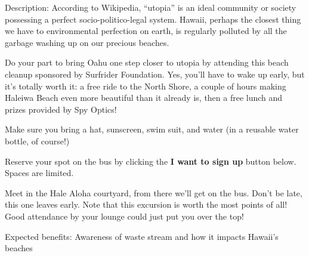 Description: According to Wikipedia, ``utopia'' is an ideal community or society possessing a perfect socio-politico-legal system. Hawaii, perhaps the closest thing we have to environmental perfection on earth, is regularly polluted by all the garbage washing up on our precious beaches.

Do your part to bring Oahu one step closer to utopia by attending this beach cleanup sponsored by Surfrider Foundation. Yes, you'll have to wake up early, but it's totally worth it: a free ride to the North Shore, a couple of hours making Haleiwa Beach even more beautiful than it already is, then a free lunch and prizes provided by Spy Optics!

Make sure you bring a hat, sunscreen, swim suit, and water (in a reusable water bottle, of course!)

Reserve your spot on the bus by clicking the \textbf{I want to sign up} button below. Spaces are limited.

Meet in the Hale Aloha courtyard, from there we'll get on the bus. Don't be late, this one leaves early. Note that this excursion is worth the most points of all! Good attendance by your lounge could just put you over the top!

Expected benefits: Awareness of waste stream and how it impacts Hawaii's beaches
